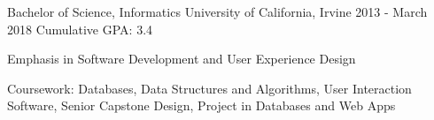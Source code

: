 

\begin{cventries}


    \cventry
    {Bachelor of Science, Informatics}%
    {University of California, Irvine}%
    {2013 - March 2018}  
    {Cumulative GPA: 3.4}  
    {
    	\begin{cvitems} %
    		\item {Emphasis in Software Development and User Experience Design}
    		\item {Coursework: Databases, Data Structures and Algorithms, User Interaction Software, Senior Capstone Design, Project in Databases and Web Apps}
    	\end{cvitems}
    }

\end{cventries}
